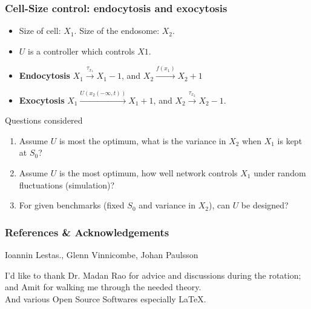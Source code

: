 \documentclass{beamer}
\begin{document}
\begin{frame}
    \frametitle{Cell-Size control: endocytosis and exocytosis}

    \begin{block}{}
        \begin{itemize}
            \item Size of cell: $X_1$. Size of the endosome: $X_2$.
            \item $U$ is a controller which controls $X1$. 
        \end{itemize}
    \end{block}

    \begin{itemize}
        \item \textbf{Endocytosis} $X_1 \xrightarrow{\tau_{x_1}} X_1 -1$, and $X_2
            \xrightarrow{f(x_1)} X_2 + 1$
        \item \textbf{Exocytosis} $X_1 \xrightarrow{U(x_2(-\infty,t))} X_1 +
            1$, and $X_2 \xrightarrow{\tau_{x_2}} X_2 - 1$.

    \end{itemize}


    \begin{block}{Questions considered}
        \begin{enumerate}
            \item Assume $U$ is most the optimum, what is the variance in
                $X_2$ when $X_1$ is kept at $S_0$?
            \item Assume $U$ is the most optimum, how well network
                controls $X_1$ under random fluctuations (simulation)?
            \item For given benchmarks (fixed $S_0$ and variance in
                $X_2$), can $U$ be designed?
        \end{enumerate}

    \end{block}

\end{frame}

\begin{frame}
    \frametitle{References \& Acknowledgements}

    \begin{thebibliography}{10}
            Ioannin Lestas., Glenn Vinnicombe, Johan Paulsson
    \end{thebibliography}

    \begin{block}{}
        
        I'd like to thank Dr. Madan Rao for advice and discussions during the
        rotation; and Amit for walking me through the needed theory. 
        \\
        And various Open Source Softwares especially \LaTeX.

    \end{block}

\end{frame}
\end{document}
